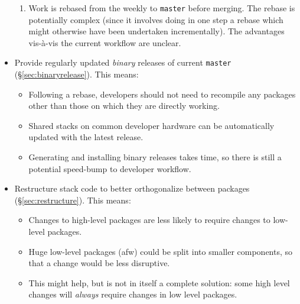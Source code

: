 \documentclass[letterpaper]{scrartcl}
\begin{document}
\begin{itemize}
{\begin{itemize}
{\begin{enumerate}
          \item{Work is rebased from the weekly to \texttt{master} before
          merging. The rebase is potentially complex (since it involves doing
          in one step a rebase which might otherwise have been undertaken
          incrementally). The advantages vis-\`a-vis the current workflow are
          unclear.}

        \end{enumerate}

      }

    \end{itemize}

  }

  \item{Provide regularly updated \textit{binary} releases of current
  \texttt{master} (\S\ref{sec:binaryrelease}). This means:

    \begin{itemize}

      \item{Following a rebase, developers should not need to recompile any
      packages other than those on which they are directly working.}

      \item{Shared stacks on common developer hardware can be automatically
      updated with the latest release.}

      \item{Generating and installing binary releases takes time, so there is
      still a potential speed-bump to developer workflow.}

    \end{itemize}

  }

  \item{Restructure stack code to better orthogonalize between packages
  (\S\ref{sec:restructure}). This means:

    \begin{itemize}

      \item{Changes to high-level packages are less likely to require changes
      to low-level packages.}

      \item{Huge low-level packages (afw) could be split into smaller
      components, so that a change would be less disruptive.}

      \item{This might help, but is not in itself a complete solution: some
      high level changes will \textit{always} require changes in low level
      packages.}


\end{itemize}}
\end{itemize}
\end{document}
